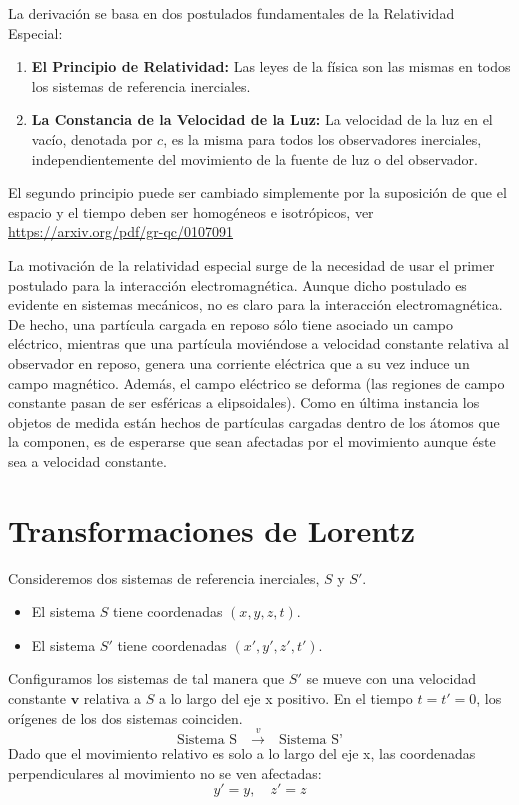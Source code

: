 \documentclass[11pt,a4paper]{book}
\begin{document}
La derivación se basa en dos postulados fundamentales de la Relatividad Especial:
\begin{enumerate}
    \item \textbf{El Principio de Relatividad:} Las leyes de la física son las mismas en todos los sistemas de referencia inerciales.
    \item \textbf{La Constancia de la Velocidad de la Luz:} La velocidad de la luz en el vacío, denotada por $c$, es la misma para todos los observadores inerciales, independientemente del movimiento de la fuente de luz o del observador.
\end{enumerate}

El segundo principio puede ser cambiado simplemente por la suposición de que el espacio y el tiempo deben ser homogéneos e isotrópicos, ver \url{https://arxiv.org/pdf/gr-qc/0107091}

La motivación de la relatividad especial surge de la necesidad de usar el primer postulado para la interacción electromagnética. Aunque dicho postulado es evidente en sistemas mecánicos, no es claro para la interacción electromagnética. De hecho, una partícula cargada en reposo sólo tiene asociado un campo eléctrico, mientras que una partícula moviéndose a velocidad constante relativa al observador en reposo, genera una corriente eléctrica que a su vez induce un campo magnético. Además, el campo eléctrico se deforma (las regiones de campo constante pasan de ser esféricas a elipsoidales). Como en última instancia los objetos de medida están hechos de partículas cargadas dentro de los átomos que la componen, es de esperarse que sean afectadas por el movimiento aunque éste sea a velocidad constante.


\section{Transformaciones de Lorentz}

Consideremos dos sistemas de referencia inerciales, $S$ y $S'$.
\begin{itemize}
    \item El sistema $S$ tiene coordenadas $(x, y, z, t)$.
    \item El sistema $S'$ tiene coordenadas $(x', y', z', t')$.
\end{itemize}
Configuramos los sistemas de tal manera que $S'$ se mueve con una velocidad constante $\boldsymbol{v}$ relativa a $S$ a lo largo del eje x positivo. En el tiempo $t=t'=0$, los orígenes de los dos sistemas coinciden.
\[
\text{Sistema S} \quad \xrightarrow{v} \quad \text{Sistema S'}
\]
Dado que el movimiento relativo es solo a lo largo del eje x, las coordenadas perpendiculares al movimiento no se ven afectadas:
\[ y' = y, \quad z' = z \]
\end{document}
